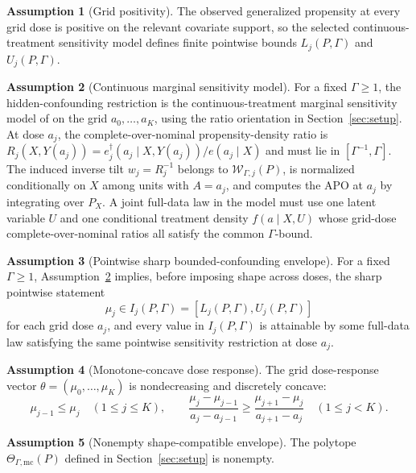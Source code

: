 \documentclass[11pt]{article}
\theoremstyle{definition}
\newtheorem{assumption}{Assumption}
\theoremstyle{plain}
\theoremstyle{remark}
\begin{document}
\begin{assumption}[Grid positivity]\label{ass:positivity}
The observed generalized propensity at every grid dose is positive on the relevant covariate support, so the selected continuous-treatment sensitivity model defines finite pointwise bounds \(L_j(P,\Gamma)\) and \(U_j(P,\Gamma)\).
\end{assumption}

\begin{assumption}[Continuous marginal sensitivity model]\label{ass:cmsm}
For a fixed \(\Gamma\ge1\), the hidden-confounding restriction is the continuous-treatment marginal sensitivity model of \citet{JessonDouglasManshausenSolalMeinshausenStierGalShalit2022} on the grid \(a_0,\ldots,a_K\), using the ratio orientation in Section~\ref{sec:setup}.  At dose \(a_j\), the complete-over-nominal propensity-density ratio is \(R_j(X,Y(a_j))=e^\dagger_j(a_j\mid X,Y(a_j))/e(a_j\mid X)\) and must lie in \([\Gamma^{-1},\Gamma]\).  The induced inverse tilt \(w_j=R_j^{-1}\) belongs to \(\mathcal W_{\Gamma,j}(P)\), is normalized conditionally on \(X\) among units with \(A=a_j\), and computes the APO at \(a_j\) by integrating over \(P_X\).  A joint full-data law in the model must use one latent variable \(U\) and one conditional treatment density \(f(a\mid X,U)\) whose grid-dose complete-over-nominal ratios all satisfy the common \(\Gamma\)-bound.
\end{assumption}

\begin{assumption}[Pointwise sharp bounded-confounding envelope]\label{ass:pointwise}
For a fixed \(\Gamma\ge1\), Assumption~\ref{ass:cmsm} implies, before imposing shape across doses, the sharp pointwise statement
\[
\mu_j\in I_j(P,\Gamma)=[L_j(P,\Gamma),U_j(P,\Gamma)]
\]
for each grid dose \(a_j\), and every value in \(I_j(P,\Gamma)\) is attainable by some full-data law satisfying the same pointwise sensitivity restriction at dose \(a_j\).
\end{assumption}

\begin{assumption}[Monotone-concave dose response]\label{ass:mc}
The grid dose-response vector \(\theta=(\mu_0,\ldots,\mu_K)\) is nondecreasing and discretely concave:
\[
\mu_{j-1}\le\mu_j\quad(1\le j\le K),\qquad
\frac{\mu_j-\mu_{j-1}}{a_j-a_{j-1}}\ge
\frac{\mu_{j+1}-\mu_j}{a_{j+1}-a_j}\quad(1\le j<K).
\]
\end{assumption}

\begin{assumption}[Nonempty shape-compatible envelope]\label{ass:nonempty}
The polytope \(\Theta_{\Gamma,\mathrm{mc}}(P)\) defined in Section~\ref{sec:setup} is nonempty.
\end{assumption}
\end{document}
